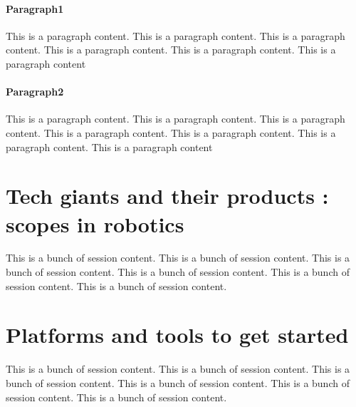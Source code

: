 \paragraph{Paragraph1}
This is a paragraph content. This is a paragraph content. This is a paragraph content. This is a paragraph content. This is a paragraph content. This is a paragraph content
\paragraph{Paragraph2}
This is a paragraph content. This is a paragraph content. This is a paragraph content. This is a paragraph content. This is a paragraph content. This is a paragraph content. This is a paragraph content

\section{Tech giants and their products : scopes in robotics}
This is a bunch of session content. This is a bunch of session content. This is a bunch of session content. This is a bunch of session content. This is a bunch of session content. This is a bunch of session content. %

\section{Platforms and tools to get started}
This is a bunch of session content. This is a bunch of session content. This is a bunch of session content. This is a bunch of session content. This is a bunch of session content. This is a bunch of session content. %
